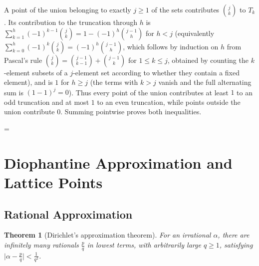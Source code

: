 \documentclass[11pt]{article}
\makeatletter
\theoremstyle{ntstyle}
\newtheorem{theorem}{Theorem}[subsection]
\let\nt@closedisplay\]
\def\nt@guardedclose{\@ifnextchar\par{\nt@closeafterpar}{\@ifnextchar\end{\postdisplaypenalty\@M\nt@closedisplay}{\nt@closedisplay}}}
\def\nt@closeafterpar\par{\@ifnextchar\par{\nt@closeafterpar}{\@ifnextchar\end{\postdisplaypenalty\@M\nt@closedisplay\par}{\nt@closedisplay\par}}}
\renewenvironment{proof}[1][\proofname]{\par
  \pushQED{\qed}\normalfont\topsep\medskipamount\edef\nt@afterproof{\@endparpenalty=\the\@endparpenalty\relax}\@beginparpenalty\@M\@endparpenalty\@M\let\]\nt@guardedclose\trivlist\item[]\textit{#1\@addpunct{.}} \ignorespaces}{\ifvmode\addpenalty\@M\fi\popQED\nt@afterproof\endtrivlist\@endpefalse}
\makeatother
\begin{document}
\begin{proof} A point of the union belonging to exactly $j\ge1$ of the
	sets contributes $\binom{j}{k}$ to $T_k$. Its contribution to the
	truncation through $h$ is $\sum_{k=1}^{h}(-1)^{k-1}\binom{j}{k}=1-(-1)^h\binom{j-1}{h}$ for $h<j$ (equivalently
	$\sum_{k=0}^{h}(-1)^{k}\binom{j}{k}=(-1)^{h}\binom{j-1}{h}$, which
		follows by induction on $h$ from Pascal's rule
	$\binom{j}{k}=\binom{j-1}{k-1}+\binom{j-1}{k}$ for $1\le k\le j$, obtained by counting the $k$-element subsets of a $j$-element set according to whether they contain a fixed element), and is $1$ for $h\ge j$ (the terms with $k>j$ vanish and the full alternating sum is $(1-1)^{j}=0$). Thus
		every point of the union contributes at least $1$ to an odd truncation and at
		most $1$ to an even truncation, while points outside the union
		contribute $0$. Summing pointwise proves both inequalities.

\end{proof}
\clearpage

\section{Diophantine Approximation and Lattice Points}

\subsection{Rational Approximation}

\begin{theorem}[Dirichlet's approximation theorem]\label{thm:10.1.1} For an irrational $\alpha$,
	there are infinitely many rationals $\tfrac{p}{q}$ in lowest terms, with
	arbitrarily large $q\ge1$, satisfying $\big|\alpha - \tfrac{p}{q}\big| <
		\tfrac{1}{q^2}$.

\end{theorem}
\end{document}
